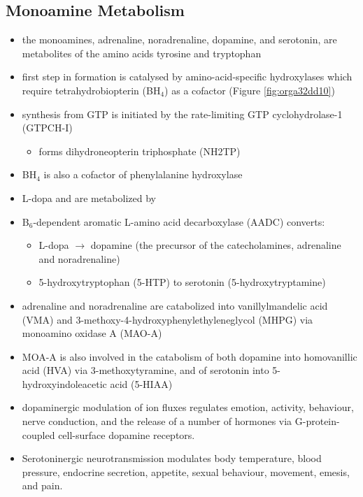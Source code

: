\documentclass{scrartcl}
\begin{document}
\subsection{Monoamine Metabolism}
\label{sec:org709ead4}
\begin{itemize}
\item the monoamines, adrenaline, noradrenaline, dopamine, and serotonin,
are metabolites of the amino acids tyrosine and tryptophan
\item first step in formation is catalysed by amino-acid-specific
hydroxylases which require tetrahydrobiopterin (BH\(_{\text{4}}\)) as a cofactor
(Figure \ref{fig:orga32dd10})
\item synthesis from GTP is initiated by the rate-limiting GTP
cyclohydrolase-1 (GTPCH-I)
\begin{itemize}
\item forms dihydroneopterin triphosphate (NH2TP)
\end{itemize}
\item BH\(_{\text{4}}\) is also a cofactor of phenylalanine hydroxylase
\item L-dopa and  are metabolized by
\item B\(_{\text{6}}\)-dependent aromatic L-amino acid decarboxylase (AADC) converts:
\begin{itemize}
\item L-dopa \(\to\) dopamine (the precursor of the catecholamines, adrenaline and
noradrenaline)
\item 5-hydroxytryptophan (5-HTP) to serotonin (5-hydroxytryptamine)
\end{itemize}
\item adrenaline and noradrenaline are catabolized into vanillylmandelic
acid (VMA) and 3-methoxy-4-hydroxyphenylethyleneglycol (MHPG) via
monoamino oxidase A (MAO-A)
\item MOA-A is also involved in the catabolism of both dopamine into
homovanillic acid (HVA) via 3-methoxytyramine, and of serotonin into
5-hydroxyindoleacetic acid (5-HIAA)
\item dopaminergic modulation of ion fluxes regulates emotion, activity,
behaviour, nerve conduction, and the release of a number of hormones
via G-protein-coupled cell-surface dopamine
receptors.
\item Serotoninergic neurotransmission modulates body temperature, blood
pressure, endocrine secretion, appetite, sexual behaviour, movement,
emesis, and pain.
\end{itemize}
\end{document}
